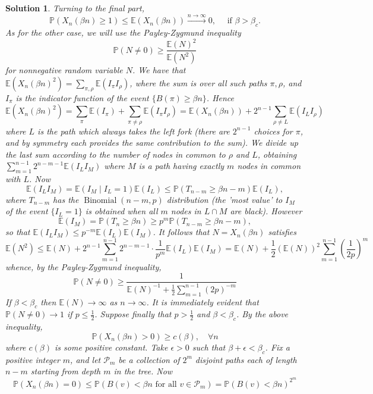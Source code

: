 \documentclass[12pt]{amsart}
\newtheorem*{solution}{Solution}
\begin{document}
\begin{solution}
Turning to the final part,
$$
\mathbb{P}(X_n(\beta n) \geq 1) \leq \mathbb{E}(X_n(\beta n)) \xrightarrow{n \rightarrow \infty} 0, \quad \text { if } \beta>\beta_c .
$$
As for the other case, we will use the Payley-Zygmund inequality
$$
\mathbb{P}(N \neq 0) \geq \frac{\mathbb{E}(N)^2}{\mathbb{E}(N^2)}
$$
for nonnegative random variable $N$.
We have that $\mathbb{E}(X_n(\beta n)^2)=\sum_{\pi, \rho} \mathbb{E}(I_\pi I_\rho)$, where the sum is over all such paths $\pi, \rho$, and $I_\pi$ is the indicator function of the event $\{B(\pi) \geq \beta n\}$. Hence
$$
\mathbb{E}(X_n(\beta n)^2)=\sum_\pi \mathbb{E}(I_\pi)+\sum_{\pi \neq \rho} \mathbb{E}(I_\pi I_\rho)=\mathbb{E}(X_n(\beta n))+2^{n-1} \sum_{\rho \neq L} \mathbb{E}(I_L I_\rho)
$$
where $L$ is the path which always takes the left fork (there are $2^{n-1}$ choices for $\pi$, and by symmetry each provides the same contribution to the sum). We divide up the last sum according to the number of nodes in common to $\rho$ and $L$, obtaining $\sum_{m=1}^{n-1} 2^{n-m-1} \mathbb{E}(I_L I_M)$ where $M$ is a path having exactly $m$ nodes in common with $L$. Now
$$
\mathbb{E}(I_L I_M)=\mathbb{E}(I_M \mid I_L=1) \mathbb{E}(I_L) \leq \mathbb{P}(T_{n-m} \geq \beta n-m) \mathbb{E}(I_L),
$$
where $T_{n-m}$ has the $\operatorname{Binomial}(n-m, p)$ distribution (the 'most value' to $I_M$ of the event $\{I_L=1\}$ is obtained when all $m$ nodes in $L \cap M$ are black). However
$$
\mathbb{E}(I_M)=\mathbb{P}(T_n \geq \beta n) \geq p^m \mathbb{P}(T_{n-m} \geq \beta n-m),
$$
so that $\mathbb{E}(I_L I_M) \leq p^{-m} \mathbb{E}(I_L) \mathbb{E}(I_M)$. It follows that $N=X_n(\beta n)$ satisfies
$$
\mathbb{E}(N^2) \leq \mathbb{E}(N)+2^{n-1} \sum_{m=1}^{n-1} 2^{n-m-1} \cdot \frac{1}{p^m} \mathbb{E}(I_L) \mathbb{E}(I_M)=\mathbb{E}(N)+\frac{1}{2}(\mathbb{E}(N))^2 \sum_{m=1}^{n-1}(\frac{1}{2 p})^m
$$
whence, by the Payley-Zygmund inequality,
$$
\mathbb{P}(N \neq 0) \geq \frac{1}{\mathbb{E}(N)^{-1}+\frac{1}{2} \sum_{m=1}^{n-1}(2 p)^{-m}}
$$
If $\beta<\beta_c$ then $\mathbb{E}(N) \rightarrow \infty$ as $n \rightarrow \infty$. It is immediately evident that $\mathbb{P}(N \neq 0) \rightarrow 1$ if $p \leq \frac{1}{2}$. Suppose finally that $p>\frac{1}{2}$ and $\beta<\beta_c$. By the above inequality,
$$
\mathbb{P}(X_n(\beta n)>0) \geq c(\beta), \quad \forall n
$$
where $c(\beta)$ is some positive constant. Take $\epsilon>0$ such that $\beta+\epsilon<\beta_c$. Fix a positive integer $m$, and let $\mathcal{P}_m$ be a collection of $2^m$ disjoint paths each of length $n-m$ starting from depth $m$ in the tree. Now
$$
\mathbb{P}(X_n(\beta n)=0) \leq \mathbb{P}(B(v)<\beta n \text { for all } v \in \mathcal{P}_m)=\mathbb{P}(B(v)<\beta n)^{2^m}
$$
\end{solution}
\end{document}
